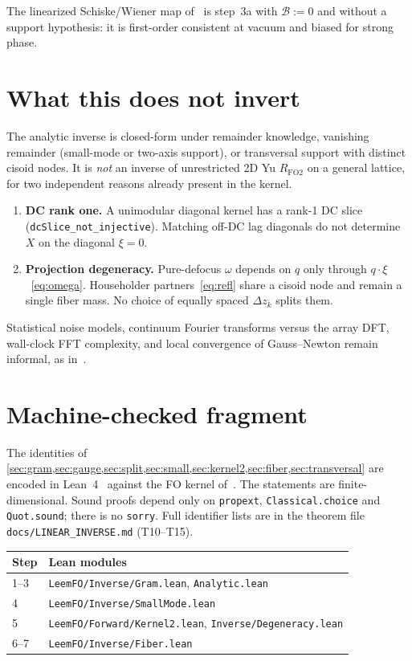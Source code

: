 \documentclass[11pt,a4paper]{article}
\theoremstyle{definition}
\theoremstyle{remark}
\newcommand{\Dz}{\Delta z}
\newcommand{\RFOII}{R_{\mathrm{FO2}}}
\begin{document}
The linearized Schiske/Wiener map of~\cite{Lau2026inverse} is step~3a
with $\mathcal{B}:=0$ and without a support hypothesis: it is
first-order consistent at vacuum and biased for strong phase.

\section{What this does not invert}
\label{sec:not}

The analytic inverse is closed-form under remainder knowledge,
vanishing remainder (small-mode or two-axis support), or transversal
support with distinct cisoid nodes.
It is \emph{not} an inverse of unrestricted 2D Yu $\RFOII$ on a
general lattice, for two independent reasons already present in the
kernel.

\begin{enumerate}[leftmargin=*]
\item \textbf{DC rank one.}
A unimodular diagonal kernel has a rank-1 DC slice
(\texttt{dcSlice\_not\_injective}).
Matching off-DC lag diagonals do not determine $X$ on the
diagonal $\xi=0$.

\item \textbf{Projection degeneracy.}
Pure-defocus $\omega$ depends on $q$ only through
$q\cdot\xi$~\eqref{eq:omega}.
Householder partners~\eqref{eq:refl} share a cisoid node and
remain a single fiber mass.
No choice of equally spaced $\Dz_k$ splits them.
\end{enumerate}

Statistical noise models, continuum Fourier transforms versus the
array DFT, wall-clock FFT complexity, and local convergence of
Gauss--Newton remain informal, as in~\cite{Lau2026inverse}.

\section{Machine-checked fragment}
\label{sec:lean}

The identities of
\cref{sec:gram,sec:gauge,sec:split,sec:small,sec:kernel2,sec:fiber,sec:transversal}
are encoded in Lean~4~\cite{deMoura2021,mathlib2020} against the FO
kernel of~\cite{Yu2019,Lau2026proofs}.
The statements are finite-dimensional.
Sound proofs depend only on
\texttt{propext}, \texttt{Classical.choice} and \texttt{Quot.sound};
there is no \texttt{sorry}.
Full identifier lists are in the theorem file
\texttt{docs/LINEAR\_INVERSE.md} (T10--T15).

\begin{center}
\small
\begin{tabular}{@{}ll@{}}
\toprule
Step & Lean modules \\
\midrule
1--3 & \texttt{LeemFO/Inverse/Gram.lean}, \texttt{Analytic.lean} \\
4 & \texttt{LeemFO/Inverse/SmallMode.lean} \\
5 & \texttt{LeemFO/Forward/Kernel2.lean}, \texttt{Inverse/Degeneracy.lean} \\
6--7 & \texttt{LeemFO/Inverse/Fiber.lean} \\
\bottomrule
\end{tabular}
\end{center}
\end{document}
